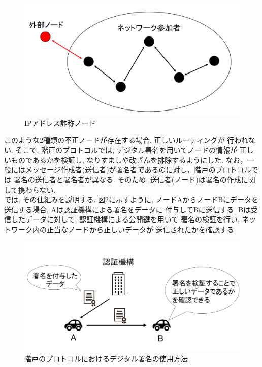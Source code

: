\begin{figure}
  \centering
  \includegraphics[scale=0.6]{figures/ip-liar.png}
  \caption{IPアドレス詐称ノード\cite{shinato}}
  \label{fig:ip-liar}
\end{figure}

\indent このような2種類の不正ノードが存在する場合, 正しいルーティングが
行われない. そこで, 階戸のプロトコルでは, デジタル署名を用いてノードの情報が
正しいものであるかを検証し, なりすましや改ざんを排除するようにした. 
なお，一般にはメッセージ作成者(送信者)が署名者であるのに対し，階戸のプロトコルでは
署名の送信者と署名者が異なる. そのため, 送信者(ノード)は署名の作成に関して携わらない.  \\
\indent では, その仕組みを説明する. 図\ref{fig:signature-method}に示すように, 
ノードAからノードBにデータを送信する場合, Aは認証機構による署名をデータに
付与してBに送信する. Bは受信したデータに対して, 認証機構による公開鍵を用いて
署名の検証を行い, ネットワーク内の正当なノードから正しいデータが
送信されたかを確認する. 
\newpage

\begin{figure}
  \centering
  \includegraphics[scale=0.6]{figures/signature-method.png}
  \caption{階戸のプロトコルにおけるデジタル署名の使用方法\cite{shinato}}
  \label{fig:signature-method}
\end{figure}

